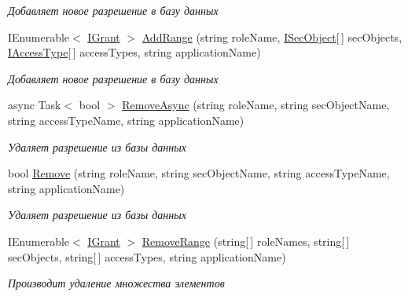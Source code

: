 \begin{DoxyCompactItemize}
\begin{DoxyCompactList}\small\item\em Добавляет новое разрешение в базу данных \end{DoxyCompactList}\item 
I\+Enumerable$<$ \hyperlink{interface_security_1_1_interfaces_1_1_model_1_1_i_grant}{I\+Grant} $>$ \hyperlink{class_security_1_1_entity_framework_1_1_collections_1_1_grant_collection_abc7cd27b59cacbce219d901cf7b68855}{Add\+Range} (string role\+Name, \hyperlink{interface_security_1_1_interfaces_1_1_model_1_1_i_sec_object}{I\+Sec\+Object}\mbox{[}$\,$\mbox{]} sec\+Objects, \hyperlink{interface_security_1_1_interfaces_1_1_model_1_1_i_access_type}{I\+Access\+Type}\mbox{[}$\,$\mbox{]} access\+Types, string application\+Name)
\begin{DoxyCompactList}\small\item\em Добавляет новое разрешение в базу данных \end{DoxyCompactList}\item 
async Task$<$ bool $>$ \hyperlink{class_security_1_1_entity_framework_1_1_collections_1_1_grant_collection_a383a8579fd834bb06c7eb19140a07371}{Remove\+Async} (string role\+Name, string sec\+Object\+Name, string access\+Type\+Name, string application\+Name)
\begin{DoxyCompactList}\small\item\em Удаляет разрешение из базы данных \end{DoxyCompactList}\item 
bool \hyperlink{class_security_1_1_entity_framework_1_1_collections_1_1_grant_collection_a22e80b37be968a99e10b00c8b67f2172}{Remove} (string role\+Name, string sec\+Object\+Name, string access\+Type\+Name, string application\+Name)
\begin{DoxyCompactList}\small\item\em Удаляет разрешение из базы данных \end{DoxyCompactList}\item 
I\+Enumerable$<$ \hyperlink{interface_security_1_1_interfaces_1_1_model_1_1_i_grant}{I\+Grant} $>$ \hyperlink{class_security_1_1_entity_framework_1_1_collections_1_1_grant_collection_ae7657aa18e3d6ef6a1848e8521f7e8e7}{Remove\+Range} (string\mbox{[}$\,$\mbox{]} role\+Names, string\mbox{[}$\,$\mbox{]} sec\+Objects, string\mbox{[}$\,$\mbox{]} access\+Types, string application\+Name)
\begin{DoxyCompactList}\small\item\em Производит удаление множества элементов \end{DoxyCompactList}\item 

\end{DoxyCompactItemize}

